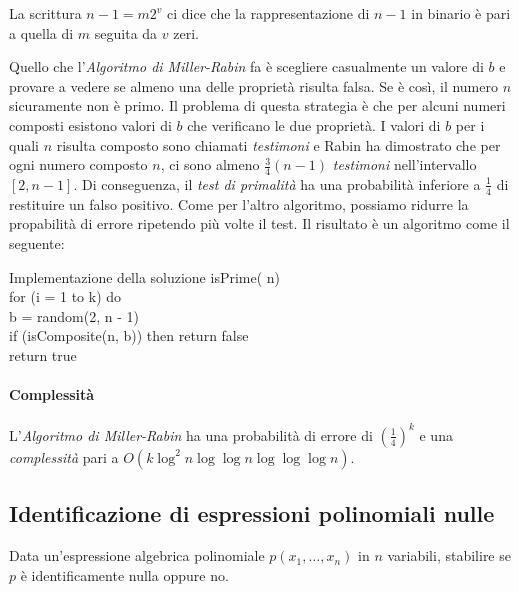 \begin{note}
    La scrittura $n-1=m2^v$ ci dice che la rappresentazione di $n-1$ in
    binario è pari a quella di $m$ seguita da $v$ zeri.
\end{note}

\noindent
Quello che l'\emph{Algoritmo di Miller-Rabin} fa è scegliere casualmente un
valore di $b$ e provare a vedere se almeno una delle proprietà risulta
falsa. Se è così, il numero $n$ sicuramente non è primo. Il problema di
questa strategia è che per alcuni numeri composti esistono valori di $b$
che verificano le due proprietà. I valori di $b$ per i quali $n$ risulta
composto sono chiamati \emph{testimoni} e Rabin ha dimostrato che
per ogni numero composto $n$, ci sono almeno $\frac{3}{4}(n-1)$
\emph{testimoni} nell'intervallo $[2,n-1]$. Di conseguenza, il \emph{test di
primalità} ha una probabilità inferiore a $\frac{1}{4}$ di restituire un falso
positivo. Come per l'altro algoritmo, possiamo ridurre la propabilità di errore
ripetendo più volte il test. Il risultato è un algoritmo come il seguente:

\begin{minicode}{Implementazione della soluzione}
\ind{} isPrime( n)\\
    \indf for (i = 1 to k) do\\
         b = random(2, n - 1)\\
        \indff if (isComposite(n, b)) then\hfill{}
            return false\\
    \indf return true
\end{minicode}

\paragraph{Complessità}
L'\emph{Algoritmo di Miller-Rabin} ha una probabilità di errore di
$\left(\frac{1}{4}\right)^k$ e una \emph{complessità} pari a
$O(k\log^2 n\log\log n\log\log\log n)$.

\subsection{Identificazione di espressioni polinomiali nulle}
\begin{problem}
    Data un'espressione algebrica polinomiale $p(x_1,\dots,x_n)$ in $n$
    variabili, stabilire se $p$ è identificamente nulla oppure no.
\end{problem}

